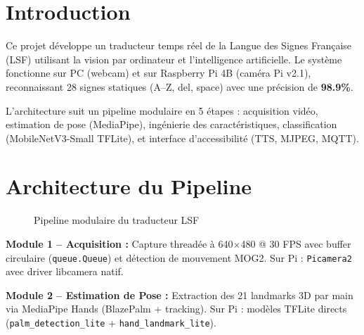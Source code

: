 \documentclass[11pt,a4paper]{article}
\begin{document}
\section{Introduction}

Ce projet développe un traducteur temps réel de la Langue des Signes Française (LSF) utilisant la vision par ordinateur et l'intelligence artificielle. Le système fonctionne sur PC (webcam) et sur Raspberry Pi 4B (caméra Pi v2.1), reconnaissant 28 signes statiques (A--Z, del, space) avec une précision de \textbf{98.9\%}.

L'architecture suit un pipeline modulaire en 5 étapes : acquisition vidéo, estimation de pose (MediaPipe), ingénierie des caractéristiques, classification (MobileNetV3-Small TFLite), et interface d'accessibilité (TTS, MJPEG, MQTT).

\section{Architecture du Pipeline}

\begin{figure}[H]
\centering
{}
\caption{Pipeline modulaire du traducteur LSF}
\end{figure}

\textbf{Module 1 -- Acquisition :} Capture threadée à 640$\times$480 @ 30 FPS avec buffer circulaire (\texttt{queue.Queue}) et détection de mouvement MOG2. Sur Pi : \texttt{Picamera2} avec driver libcamera natif.

\textbf{Module 2 -- Estimation de Pose :} Extraction des 21 landmarks 3D par main via MediaPipe Hands (BlazePalm + tracking). Sur Pi : modèles TFLite directs (\texttt{palm\_detection\_lite} + \texttt{hand\_landmark\_lite}).
\end{document}
